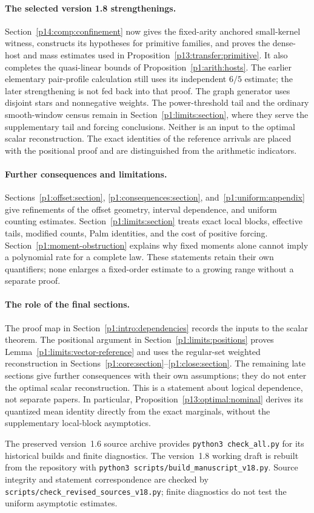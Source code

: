 \paragraph{The selected version 1.8 strengthenings.}
Section~\ref{p14:comp:confinement} now gives the fixed-arity anchored
small-kernel witness, constructs its hypotheses for primitive families,
and proves the dense-host and mass estimates used in
Proposition~\ref{p13:transfer:primitive}. It also completes the
quasi-linear bounds of Proposition~\ref{p1:arith:hosts}. The earlier
elementary pair-profile calculation still uses its independent
$6/5$ estimate; the later strengthening is not fed back into that proof.
The graph generator uses disjoint stars and nonnegative weights.
The power-threshold tail and the ordinary smooth-window census remain
in Section~\ref{p1:limits:section}, where they serve the supplementary
tail and forcing conclusions. Neither is an input to the optimal
scalar reconstruction. The exact identities of the reference arrivals
are placed with the positional proof and are distinguished from the
arithmetic indicators.

\paragraph{Further consequences and limitations.}
Sections~\ref{p1:offset:section}, \ref{p1:consequences:section},
and~\ref{p1:uniform:appendix} give refinements of the offset
geometry, interval dependence, and uniform counting estimates.
Section~\ref{p1:limits:section} treats exact local blocks,
effective tails, modified counts, Palm identities, and the cost
of positive forcing. Section~\ref{p1:moment-obstruction}
explains why fixed moments alone cannot imply a polynomial
rate for a complete law. These statements retain their own
quantifiers; none enlarges a fixed-order estimate to a growing
range without a separate proof.

\paragraph{The role of the final sections.}
The proof map in Section~\ref{p1:intro:dependencies} records
the inputs to the scalar theorem.
The positional argument in Section~\ref{p1:limits:positions}
proves Lemma~\ref{p1:limits:vector-reference} and uses the
regular-set weighted reconstruction in Sections~\ref{p1:core:section}--\ref{p1:close:section}.
The remaining late sections give further consequences with their own
assumptions; they do not enter the optimal scalar reconstruction.
This is a statement about logical dependence, not separate papers.
In particular, Proposition~\ref{p13:optimal:nominal} derives its
quantized mean identity directly from the exact marginals,
without the supplementary local-block asymptotics.

The preserved version~1.6 source archive provides
\texttt{python3 check\_all.py} for its historical builds and finite
diagnostics. The version~1.8 working draft is rebuilt from the repository with
\texttt{python3 scripts/build\_manuscript\_v18.py}.
Source integrity and statement correspondence are checked by
\texttt{scripts/check\_revised\_sources\_v18.py}; finite diagnostics
do not test the uniform asymptotic estimates.
